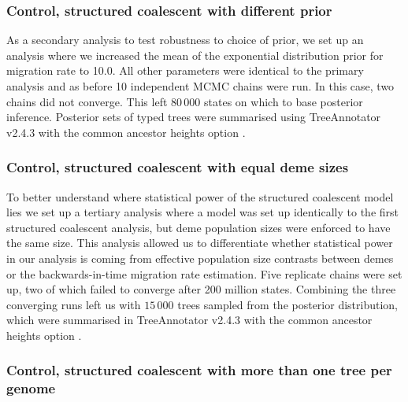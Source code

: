\documentclass[9pt,lineno]{elife}
\begin{document}
\subsubsection*{Control, structured coalescent with different prior}

As a secondary analysis to test robustness to choice of prior, we set up an analysis where we increased the mean of the exponential distribution prior for migration rate to 10.0.
All other parameters were identical to the primary analysis and as before 10 independent MCMC chains were run.
In this case, two chains did not converge.
This left $80\,000$ states on which to base posterior inference.
Posterior sets of typed trees were summarised using TreeAnnotator v2.4.3 with the common ancestor heights option \citep{heled_looking_2013}.

\subsubsection*{Control, structured coalescent with equal deme sizes}

To better understand where statistical power of the structured coalescent model lies we set up a tertiary analysis where a model was set up identically to the first structured coalescent analysis, but deme population sizes were enforced to have the same size.
This analysis allowed us to differentiate whether statistical power in our analysis is coming from effective population size contrasts between demes or the backwards-in-time migration rate estimation.
Five replicate chains were set up, two of which failed to converge after 200 million states.
Combining the three converging runs left us with $15\,000$ trees sampled from the posterior distribution, which were summarised in TreeAnnotator v2.4.3 with the common ancestor heights option \citep{heled_looking_2013}.

\subsubsection*{Control, structured coalescent with more than one tree per genome}
\end{document}
